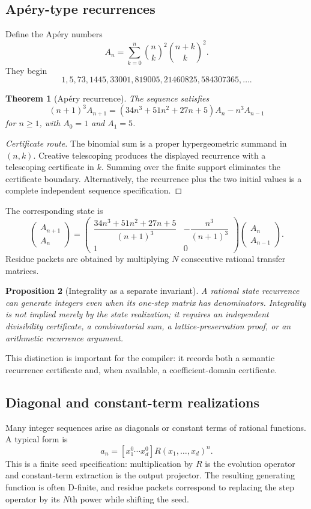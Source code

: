 \documentclass[11pt]{article}
\newtheorem{theorem}{Theorem}[section]\newtheorem{proposition}[theorem]{Proposition}\newtheorem{lemma}[theorem]{Lemma}\newtheorem{corollary}[theorem]{Corollary}
\theoremstyle{definition}\newtheorem{definition}[theorem]{Definition}\newtheorem{example}[theorem]{Example}\newtheorem{construction}[theorem]{Construction}\newtheorem{algorithm}[theorem]{Algorithm}\newtheorem{conjecture}[theorem]{Conjecture}\newtheorem{problem}[theorem]{Problem}
\theoremstyle{remark}\newtheorem{remark}[theorem]{Remark}\newtheorem{boundary}[theorem]{Boundary}\newtheorem{certificate}[theorem]{Computational Certificate}\newtheorem{classical}[theorem]{Classical Input}\newtheorem{principle}[theorem]{Structural Principle}
\begin{document}
\subsection{Ap\'ery-type recurrences}
Define the Ap\'ery numbers
\[
 A_n=\sum_{k=0}^{n}\binom nk^2\binom{n+k}{k}^2.
\]
They begin
\[
 1,5,73,1445,33001,819005,21460825,584307365,\ldots.
\]

\begin{theorem}[Ap\'ery recurrence]
The sequence satisfies
\[
 \boxed{(n+1)^3A_{n+1}=(34n^3+51n^2+27n+5)A_n-n^3A_{n-1}}
\]
for $n\geq1$, with $A_0=1$ and $A_1=5$.
\end{theorem}
\begin{proof}[Certificate route]
The binomial sum is a proper hypergeometric summand in $(n,k)$.  Creative telescoping produces the displayed recurrence with a telescoping certificate in $k$.  Summing over the finite support eliminates the certificate boundary.  Alternatively, the recurrence plus the two initial values is a complete independent sequence specification.
\end{proof}

The corresponding state is
\[
 \begin{pmatrix}A_{n+1}\\A_n\end{pmatrix}
 =
 \begin{pmatrix}
 \dfrac{34n^3+51n^2+27n+5}{(n+1)^3}&-\dfrac{n^3}{(n+1)^3}\\[1em]
 1&0
 \end{pmatrix}
 \begin{pmatrix}A_n\\A_{n-1}\end{pmatrix}.
\]
Residue packets are obtained by multiplying $N$ consecutive rational transfer matrices.

\begin{proposition}[Integrality as a separate invariant]
A rational state recurrence can generate integers even when its one-step matrix has denominators.  Integrality is not implied merely by the state realization; it requires an independent divisibility certificate, a combinatorial sum, a lattice-preservation proof, or an arithmetic recurrence argument.
\end{proposition}

This distinction is important for the compiler: it records both a semantic recurrence certificate and, when available, a coefficient-domain certificate.

\subsection{Diagonal and constant-term realizations}
Many integer sequences arise as diagonals or constant terms of rational functions.  A typical form is
\[
 a_n=[x_1^0\cdots x_d^0]R(x_1,\ldots,x_d)^n.
\]
This is a finite seed specification: multiplication by $R$ is the evolution operator and constant-term extraction is the output projector.  The resulting generating function is often D-finite, and residue packets correspond to replacing the step operator by its $N$th power while shifting the seed.
\end{document}
